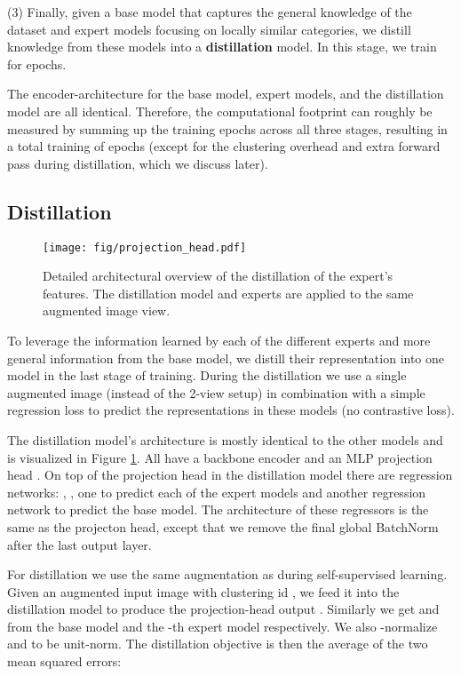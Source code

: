 \documentclass[final]{cvpr}
\begin{document}
(3) Finally, given a base model that captures the general knowledge of the dataset and expert models focusing on locally similar categories, we distill knowledge from these models into a \textbf{distillation} model. In this stage, we train for  epochs.

The encoder-architecture for the base model, expert models, and the distillation model are all identical. Therefore, the computational footprint can roughly be measured by summing up the training epochs across all three stages, resulting in a total training of  epochs (except for the clustering overhead and extra forward pass during distillation, which we discuss later).

\subsection{Distillation}
\label{section:distill}

\begin{figure}[t]
  \centering
  \texttt{[image: fig/projection\_head.pdf]}
  \caption{Detailed architectural overview of the distillation of the expert's features. The distillation model and experts are applied to the same augmented image view.}\label{fig:distillation}
\end{figure}

To leverage the information learned by each of the different experts and more general information from the base model, we distill their representation into one model in the last stage of training. During the distillation we use a single augmented image (instead of the 2-view setup) in combination with a simple regression loss to predict the representations in these models (no contrastive loss).

The distillation model's architecture is mostly identical to the other models and is visualized in Figure \ref{fig:distillation}. All have a backbone encoder  and an MLP projection head . On top of the projection head in the distillation model there are  regression networks: , , one to predict each of the  expert models and another regression network  to predict the base model. The architecture of these regressors is the same as the projecton head, except that we remove the final global BatchNorm after the last output layer.

For distillation we use the same augmentation as during self-supervised learning. Given an augmented input image  with clustering id , we feed it into the distillation model to produce the projection-head output . Similarly we get  and  from the base model and the -th expert model respectively. We also -normalize  and  to be unit-norm. The distillation objective is then the average of the two mean squared errors:
\vspace{-3pt}
\end{document}
